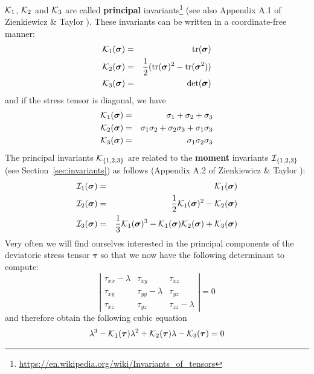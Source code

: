 \noindent ${\cal K}_1$, ${\cal K}_2$ and ${\cal K}_3$ are called {\bf principal}
invariants\footnote{\url{https://en.wikipedia.org/wiki/Invariants_of_tensors}} 
(see also Appendix A.1 of Zienkiewicz \& Taylor \cite{zita2}). 
These invariants can be written in a coordinate-free manner:
\begin{eqnarray}
{\cal K}_1({\bm \sigma}) &=& {\rm tr}({\bm \sigma})  \nonumber\\
{\cal K}_2({\bm \sigma}) &=& \frac{1}{2}(  {\rm tr}({\bm \sigma}) ^2 - {\rm tr}({\bm \sigma}^2)  ) \nonumber\\
{\cal K}_3({\bm \sigma}) &=& \det ({\bm \sigma}) \nonumber
\end{eqnarray}
and if the stress tensor is diagonal, we have
\begin{eqnarray}
{\cal K}_1({\bm \sigma}) &=& \sigma_{1}+\sigma_{2}+\sigma_{3}\nonumber\\
{\cal K}_2({\bm \sigma}) &=& \sigma_{1}\sigma_{2}+\sigma_{2}\sigma_{3}+\sigma_{1}\sigma_{3} \nonumber\\
{\cal K}_3({\bm \sigma}) &=& \sigma_1\sigma_2\sigma_3 \nonumber
\end{eqnarray}
The principal invariants ${\cal K}_{\{1,2,3\}}$ are related to the {\bf moment} 
invariants ${\cal I}_{\{1,2,3\}}$ 
(see Section~\ref{sec:invariants}) as follows (Appendix A.2 of Zienkiewicz \& Taylor \cite{zita2}):
\begin{eqnarray}
{\cal I}_1({\bm \sigma})&=& {\cal K}_1({\bm \sigma}) \\ 
{\cal I}_2({\bm \sigma})&=& \frac{1}{2}{\cal K}_1({\bm \sigma})^2 -{\cal K}_2({\bm \sigma}) \label{eq:IK2}\\
{\cal I}_3({\bm \sigma})&=& \frac{1}{3}{\cal K}_1({\bm \sigma})^3 -{\cal K}_1({\bm \sigma}) 
{\cal K}_2({\bm \sigma}) + {\cal K}_3({\bm \sigma}) \label{eq:IK3}
\end{eqnarray}
Very often we will find ourselves interested in the principal components 
of the deviatoric stress tensor $\bm \tau$ so that we now have the following determinant to compute:
\[
\left|  
\begin{array}{ccc}
\tau_{xx}-\lambda & \tau_{xy} & \tau_{xz} \\
\tau_{xy} & \tau_{yy}-\lambda & \tau_{yz} \\
\tau_{xz} & \tau_{yz} & \tau_{zz} -\lambda
\end{array}
\right|
=0
\]
and therefore obtain the following cubic equation
\begin{equation}
\lambda^3 - {\cal K}_1({\bm \tau}) \lambda^2 + {\cal K}_2({\bm \tau}) \lambda -{\cal K}_3({\bm \tau})=0
\end{equation}
